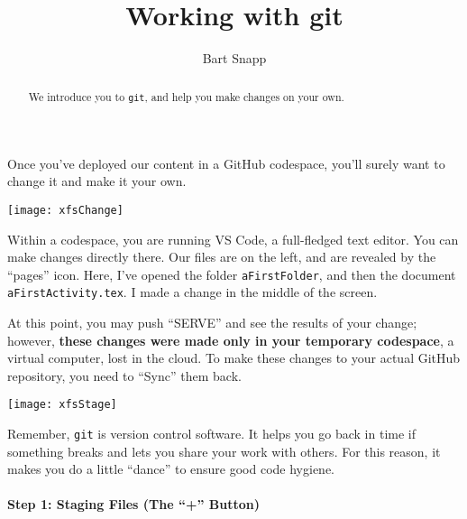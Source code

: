 \documentclass{ximera}
\author{Bart Snapp}
\title{Working with git}
\begin{document}
\pdfOnly{\onecolumn}
\begin{abstract}
    We introduce you to \texttt{git}, and help you make changes on your own.
\end{abstract}
\maketitle
Once you've deployed our content in a GitHub codespace, you'll surely want to
change it and  make it your own.
\begin{image}
    \texttt{[image: xfsChange]}
\end{image}
    Within a codespace, you are running VS Code, a
    full-fledged text editor. You can make changes directly there. Our files
    are on
    the left, and are revealed by the ``pages'' icon.
    Here, I've opened the folder \verb!aFirstFolder!, and then the document
    \verb!aFirstActivity.tex!. I made a change in the middle of the screen.

    At this point, you may push ``SERVE'' and see the results of your change;
    however, \textbf{these changes were made only in your temporary codespace},
    a
    virtual
    computer, lost in the cloud. To make these changes to your actual GitHub
    repository, you need to ``Sync'' them back.
\pdfOnly{\end{multicols}}

\newpage

\begin{image}
    \texttt{[image: xfsStage]}
\end{image}

    Remember, \verb!git! is version control software.  It helps you go back in time if something breaks and lets you
    share
    your work with others. For this reason, it makes you do a little ``dance''
    to ensure good code hygiene.

    \paragraph{Step 1: Staging Files (The ``+'' Button)}
\end{document}
